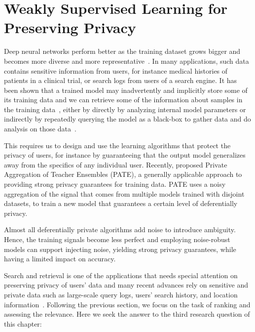 \section{Weakly Supervised Learning for Preserving Privacy}
Deep neural networks perform better as the training dataset grows bigger and becomes more diverse and more representative~\citep{sun2017revisiting}.  In many applications, such data contains sensitive information from users, for instance medical histories of patients in a clinical trial, or search logs from users of a search engine.  
It has been shown that a trained model may inadvertently
and implicitly store some of its training data and we can retrieve some of the information about samples in the training data~\citep{Shokri:2015}, either by directly by analyzing internal model parameters or indirectly by repeatedly querying the model as a black-box to gather data and do analysis on those data~\citep{Fredrikson:2015}. 

This requires us to design and use the learning algorithms that protect the privacy of users, for instance by guaranteeing that the output model generalizes away from the specifics of any
individual user. Recently, \citet{Papernot:2017} proposed Private Aggregation of Teacher Ensembles (PATE), a generally applicable approach to providing strong privacy guarantees for training data.  PATE uses a noisy aggregation of the signal that comes from multiple models trained with disjoint datasets, to train a new model that guarantees a certain level of deferentially privacy.

Almost all deferentially private algorithms add noise to introduce ambiguity. Hence, the training signals become less perfect and employing noise-robust models can support injecting noise, yielding strong privacy guarantees, while having a limited impact on accuracy.

Search and retrieval is one of the applications that needs special attention on preserving privacy of users' data and many recent advances rely on sensitive and private data such as large-scale query logs, users’ search history, and location information~\citep{Yang:2017}. Following the previous section, we focus on the task of ranking and assessing the relevance.
Here we seek the answer to the third research question of this chapter:

